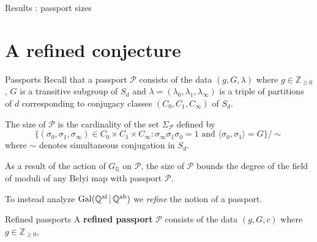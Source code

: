\documentclass[xcolor=dvipsnames,handout]{beamer}
\theoremstyle{plain}
\newcommand{\QQ}{\mathbb Q}
\newcommand{\ZZ}{\mathbb Z}
\newcommand{\QQal}{{\mathbb Q}^{\textup{al}}}
\newcommand{\QQab}{{\mathbb Q}^{\textup{ab}}}
\DeclareMathOperator{\Gal}{Gal}
\begin{document}
{\begin{frame}[fragile]{Results : passport sizes}
\begin{figure}[ht]
      \end{figure}
    \end{frame}
  }
  \section{A refined conjecture}{
    \begin{frame}{Passports}
      Recall that a passport $\mathcal{P}$
      consists of the data
      $(g,G,\lambda)$
      where $g\in\ZZ_{\geq 0}$,
      $G$ is a transitive subgroup of $S_d$
      and $\lambda = (\lambda_0,\lambda_1,\lambda_\infty)$
      is a triple of partitions of $d$
      corresponding to conjugacy classes $(C_0,C_1,C_\infty)$
      of $S_d$.
      \pause\par
      The size of
      $\mathcal{P}$ is the cardinality of the
      set
      $\Sigma_\mathcal{P}$
      defined by
      \[
        \Big\{
          (\sigma_0,\sigma_1,\sigma_\infty)\in C_0\times C_1\times C_\infty :
          \sigma_\infty\sigma_1\sigma_0=1
          \text{ and }
          \langle\sigma_0,\sigma_1\rangle=G
        \Big\}/\!\!\sim
      \]
      where $\sim$ denotes simultaneous conjugation in $S_d$.
      \pause\par
      As a result of the action of
      $G_\QQ$ on $\mathcal{P}$,
      the size of $\mathcal{P}$ bounds the degree of the field
      of moduli of any Belyi map with passport
      $\mathcal{P}$.
      \pause\par
      To instead analyze
      $\Gal(\QQal\,|\,\QQab)$
      we \emph{refine} the notion of a passport.
    \end{frame}
    \begin{frame}{Refined passports}
      A \textbf{refined passport} $\mathscr{P}$
      consists of the data
      $(g,G,c)$
      where $g\in\ZZ_{\geq 0}$,

\end{frame}}
\end{document}
